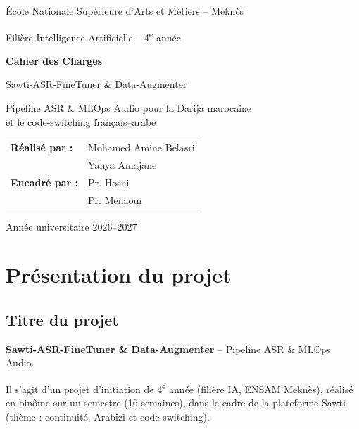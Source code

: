 \documentclass[12pt,a4paper]{report}
\begin{document}
\begin{titlepage}
  \centering
  {\large École Nationale Supérieure d'Arts et Métiers -- Meknès\par}
  {\large Filière Intelligence Artificielle -- 4\textsuperscript{e} année\par}
  \vspace{3cm}
  {\Huge\bfseries Cahier des Charges\par}
  \vspace{1cm}
  {\LARGE Sawti-ASR-FineTuner \& Data-Augmenter\par}
  \vspace{0.5cm}
  {\large Pipeline ASR \& MLOps Audio pour la Darija marocaine\\
  et le code-switching français--arabe\par}
  \vfill
  \begin{tabular}{ll}
    \textbf{Réalisé par :} & Mohamed Amine Belasri \\
                           & Yahya Amajane \\[0.5cm]
    \textbf{Encadré par :} & Pr. Hosni \\
                           & Pr. Menaoui \\
  \end{tabular}
  \vfill
  {\large Année universitaire 2026--2027\par}
\end{titlepage}

\tableofcontents
\listoftables
\listoffigures

\chapter{Présentation du projet}

\section{Titre du projet}
\textbf{Sawti-ASR-FineTuner \& Data-Augmenter} -- Pipeline ASR \& MLOps Audio.

Il s'agit d'un projet d'initiation de 4\textsuperscript{e} année (filière IA, ENSAM Meknès),
réalisé en binôme sur un semestre (16 semaines), dans le cadre de la plateforme
Sawti (thème : continuité, Arabizi et code-switching).
\end{document}
